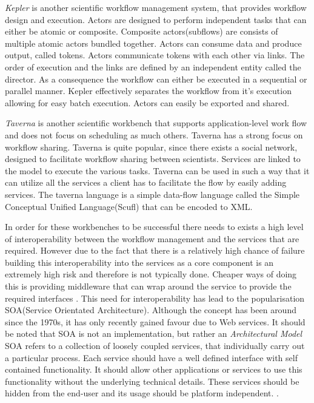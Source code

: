\documentclass[11pt,twocolumn]{article}
\begin{document}
    \emph{Kepler} is another scientific workflow
    management system, that
    provides workflow design and execution. Actors are designed
    to perform independent tasks that can either be atomic or
    composite. Composite actors(subflows) are consists of multiple
    atomic actors bundled together. Actors can consume data and
    produce output, called tokens. Actors communicate tokens with
    each other via links. The order of execution and the links are
    defined by an independent entity called the director. As a
    consequence the workflow can either be executed in a
    sequential or parallel manner. Kepler effectively separates
    the workflow from it's execution allowing for easy batch
    execution. Actors can easily be exported and shared.
    \cite{Wang:2009:KHG:1645164.1645176}

    \emph{Taverna} is another scientific workbench that supports
    application-level work flow and does not focus on scheduling
    as much others. Taverna has a strong focus on workflow
    sharing. Taverna is quite popular, since there exists
    a social network, designed to facilitate workflow sharing
    between scientists. Services are linked to the model to
    execute the various tasks. Taverna can be used in such
    a way that it can utilize all the services a client has
    to facilitate the flow by easily adding services. The
    taverna language is a simple data-flow language called
    the Simple Conceptual Unified Language(Scufl) that can
    be encoded to XML\cite{4721191}.

    In order for these workbenches to be successful there needs
    to exists a high level of interoperability between the
    workflow management and the services that are required.
    However due to the fact that there is a relatively  high
    chance of failure building this interoperability into the
    services as a core component is an extremely high risk
    and therefore is not typically done. Cheaper ways of
    doing this is providing middleware that can wrap around
    the service to provide the required interfaces
    \cite{Shegalov:2001:XWM:767132.767139}.
    This need for interoperability has lead to the
    popularisation SOA(Service Orientated Architecture).
    Although the concept has been around since the 1970s,
    it has only recently gained favour due to Web services.
    It should be noted that SOA is not an implementation,
    but rather an \emph{Architectural Model}
    SOA refers to a collection of loosely coupled services,
    that individually carry out a particular process. Each
    service should have a well defined interface with self
    contained functionality. It should allow other applications
    or services to use this functionality without the underlying
    technical details. These services should be hidden from the
    end-user and its usage should be platform independent.
    \cite{Sanders:2008:SSA:1400549.1400595}.
\end{document}

